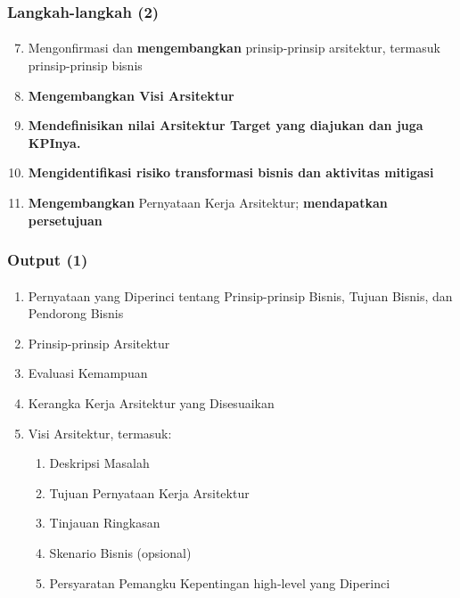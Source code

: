 \documentclass[aspectratio=169, table]{beamer}
\begin{document}
		\begin{frame}
		\frametitle{Langkah-langkah (2)}
		\framesubtitle{\hspace{1cm}}
		\begin{enumerate}
			\setcounter{enumi}{6}
			\item Mengonfirmasi dan \textbf{mengembangkan} prinsip-prinsip arsitektur, termasuk prinsip-prinsip bisnis
			\item \textbf{Mengembangkan Visi Arsitektur}
			\item \textbf{Mendefinisikan nilai Arsitektur Target yang diajukan dan juga KPInya.}
			\item \textbf{Mengidentifikasi risiko transformasi bisnis dan aktivitas mitigasi}
			\item \textbf{Mengembangkan} Pernyataan Kerja Arsitektur; \textbf{mendapatkan persetujuan}


		\end{enumerate}
	\end{frame}


	\begin{frame}
		\frametitle{Output (1)}
		\framesubtitle{\hspace{1cm}}
		\begin{enumerate}

			\item Pernyataan yang Diperinci tentang Prinsip-prinsip Bisnis, Tujuan Bisnis, dan Pendorong Bisnis
			\item Prinsip-prinsip Arsitektur
			\item Evaluasi Kemampuan
			\item Kerangka Kerja Arsitektur yang Disesuaikan
			\item Visi Arsitektur, termasuk:
			\begin{enumerate}
				\item Deskripsi Masalah
				\item Tujuan Pernyataan Kerja Arsitektur
				\item Tinjauan Ringkasan
				\item Skenario Bisnis (opsional)
				\item Persyaratan Pemangku Kepentingan high-level yang Diperinci
			\end{enumerate}
		\end{enumerate}
	\end{frame}
\end{document}
